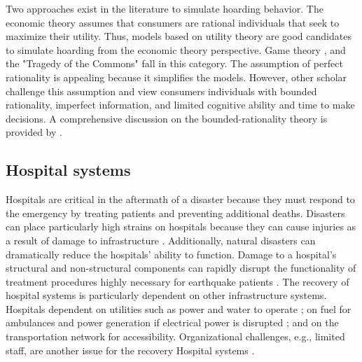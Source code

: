 Two approaches exist in the literature to simulate hoarding behavior. The economic theory assumes that consumers are rational individuals that seek to maximize their utility. Thus, models based on utility theory are good candidates to simulate hoarding from the economic theory perspective. Game theory \citep{hallsworth2000urban}, and the "Tragedy of the Commons" \citep{hardin2009tragedy} fall in this category. The assumption of perfect rationality is appealing because it simplifies the models. However, other scholar challenge this assumption and view consumers individuals with bounded rationality, imperfect information, and limited cognitive ability and time to make decisions. A comprehensive discussion on the bounded-rationality theory is provided by \cite{sep-bounded-rationality}. \

\subsection{Hospital systems}
Hospitals are critical in the aftermath of a disaster because they must respond to the emergency by treating patients and preventing additional deaths. Disasters can place particularly high strains on hospitals because they can cause injuries as a result of damage to infrastructure \citep{ceferino2018regional,ceferino2018probabilistic,johnston20142010,jun2010analysis}. Additionally, natural disasters can dramatically reduce the hospitals’ ability to function. Damage to a hospital's structural and non-structural components can rapidly disrupt the functionality of treatment procedures highly necessary for earthquake patients \citep{bambaren2011a3,mitrani2012functional}. The recovery of hospital systems is particularly dependent on other infrastructure systems. Hospitals dependent on utilities such as power and water to operate \citep{Chand2015, jacques2014resilience, Achour2014, Hiete2011, McDaniels2008}; on fuel for ambulances and power generation if electrical power is disrupted \citep{Hiete2011}; and on the transportation network for accessibility. Organizational challenges, e.g., limited staff, are another issue for the recovery Hospital systems \citep{Cimellaro2016}. \

